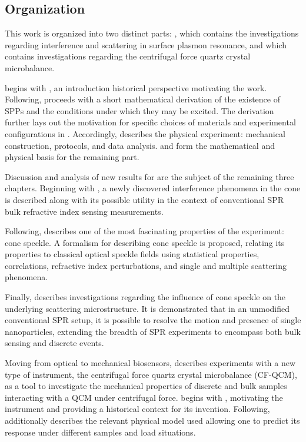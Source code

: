 \subsection*{Organization}

This work is organized into two distinct parts: , which contains
the investigations regarding interference and scattering in surface plasmon
resonance, and  which contains investigations regarding the
centrifugal force quartz crystal microbalance.

 begins with , an introduction
historical perspective motivating the work.  Following,
 proceeds with a short mathematical derivation of the
existence of SPPs and the conditions under which they may be excited.  The
derivation further lays out the motivation for specific choices of
materials and experimental configurations in .
Accordingly,  describes the physical experiment:
mechanical construction, protocols, and data analysis.
 and  form the mathematical
and physical basis for the remaining part.

Discussion and analysis of new results for  are the subject of
the remaining three chapters.  Beginning with , a
newly discovered interference phenomena in the cone is described along with its
possible utility in the context of conventional SPR bulk refractive index
sensing measurements.

Following,  describes one of the most fascinating
properties of the experiment: cone speckle.  A formalism for describing
cone speckle is proposed, relating its properties to classical optical
speckle fields using statistical properties, correlations, refractive index
perturbations, and single and multiple scattering phenomena.

Finally,  describes investigations regarding
the influence of cone speckle on the underlying scattering microstructure.
It is demonstrated that in an unmodified conventional SPR setup, it is
possible to resolve the motion and presence of single nanoparticles,
extending the breadth of SPR experiments to encompass both bulk sensing and
discrete events.  

Moving from optical to mechanical biosensors,  describes
experiments with a new type of instrument, the centrifugal force quartz
crystal microbalance (CF-QCM), as a tool to investigate the mechanical
properties of discrete and bulk samples interacting with a QCM under
centrifugal force.   begins with
, motivating the instrument and providing a
historical context for its invention.  Following,
 additionally describes the relevant physical
model used allowing one to predict its response under different samples and
load situations.

